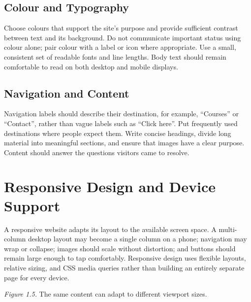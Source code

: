 \documentclass[11pt,openany,oneside]{book}
\begin{document}
\subsection{Colour and Typography}
Choose colours that support the site's purpose and provide sufficient contrast between text and its background. Do not communicate important status using colour alone; pair colour with a label or icon where appropriate. Use a small, consistent set of readable fonts and line lengths. Body text should remain comfortable to read on both desktop and mobile displays.

\subsection{Navigation and Content}
Navigation labels should describe their destination, for example, “Courses” or “Contact”, rather than vague labels such as “Click here”. Put frequently used destinations where people expect them. Write concise headings, divide long material into meaningful sections, and ensure that images have a clear purpose. Content should answer the questions visitors came to resolve.

\section{Responsive Design and Device Support}
A responsive website adapts its layout to the available screen space. A multi-column desktop layout may become a single column on a phone; navigation may wrap or collapse; images should scale without distortion; and buttons should remain large enough to tap comfortably. Responsive design uses flexible layouts, relative sizing, and CSS media queries rather than building an entirely separate page for every device.

\begin{center}
\end{center}
\textit{Figure 1.5.} The same content can adapt to different viewport sizes.
\end{document}
